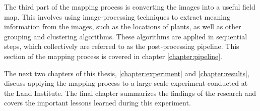 The third part of the mapping process is converting the images into a useful field map.  This involves using image-processing techniques to extract meaning information from the images, such as the locations of plants, as well as other grouping and clustering algorithms.  These algorithms are applied in sequential steps, which collectively are referred to as the post-processing pipeline.  This section of the mapping process is covered in chapter \ref{chapter:pipeline}. 

The next two chapters of this thesis, \ref{chapter:experiment} and \ref{chapter:results}, discuss applying the mapping process to a large-scale experiment conducted at the Land Institute.  The final chapter summarizes the findings of the research and covers the important lessons learned during this experiment.
